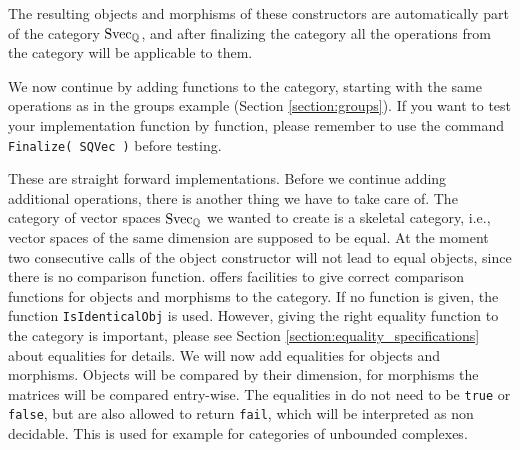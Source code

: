 The resulting objects and morphisms of these constructors
are automatically part of the category $\mathrm{Svec}_{\mathbb{Q}}$, and after finalizing the category all the operations from the
category will be applicable to them.

We now continue by adding functions to the category, starting with the same operations as in the groups example (Section \ref{section:groups}).
If you want to test your implementation function by function,
please remember to use the command \texttt{Finalize( SQVec )}
before testing. 



These are straight forward implementations. Before we continue
adding additional operations, there is another thing we have to take care of. The category of vector spaces $\mathrm{Svec}_{\mathbb{Q}}$ we wanted
to create is a skeletal category, i.e., vector spaces of the same dimension are supposed to be equal. At the moment
two consecutive calls of the object constructor will not lead to equal objects, since there is no comparison function.
\CapPkg offers facilities to give correct comparison functions for objects and morphisms to the category. If no function
is given, the \GAP function \texttt{IsIdenticalObj} is used. However, giving the right equality function to the
category is important, please see Section \ref{section:equality_specifications} about equalities for details. We will now add equalities
for objects and morphisms. Objects will be compared by their dimension, for morphisms the matrices will be compared entry-wise.
The equalities in \CapPkg do not need to be \texttt{true} or \texttt{false}, but are also allowed to return \texttt{fail},
which will be interpreted as non decidable. This is used for example for categories of unbounded complexes.



